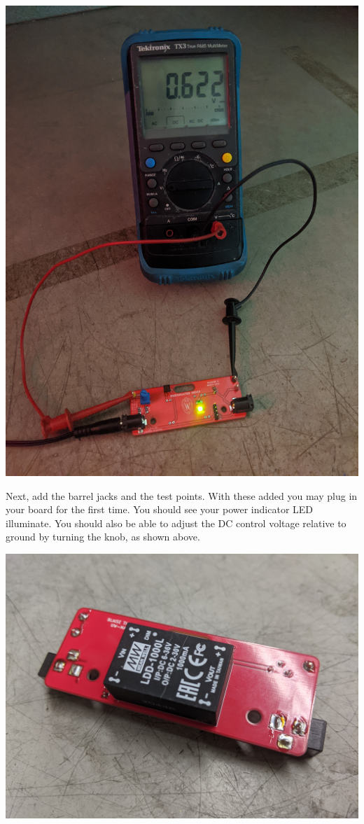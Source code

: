 \documentclass[11pt]{article}
\begin{document}
\begin{center}
  \includegraphics[width=\textwidth/2]{"./barrels-tested.jpg"}
\end{center}

Next, add the barrel jacks and the test points.
With these added you may plug in your board for the first time.
You should see your power indicator LED illuminate.
You should also be able to adjust the DC control voltage relative to ground by turning the knob, as shown above.

\begin{center}
  \includegraphics[width=\textwidth/2]{"./pcb-driver.jpg"}
\end{center}
\end{document}
